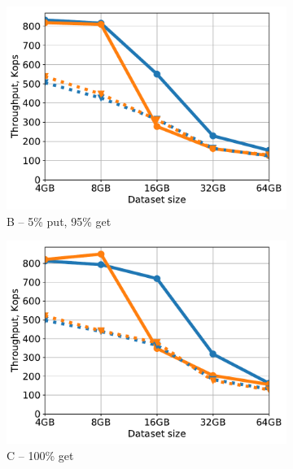 \begin{figure}[tb]
\begin{subfigure}{0.33\linewidth}
\includegraphics[width=\textwidth]{figs/Workload_B_line.pdf}
\caption{B -- 5\% put, 95\% get}
\label{fig:throughput:b}
\end{subfigure}
\hspace{70pt}
\begin{subfigure}{0.33\linewidth}
\includegraphics[width=\textwidth]{figs/Workload_C_line.pdf}
\caption{C -- 100\% get}
\label{fig:throughput:c}
\end{subfigure}
\begin{subfigure}{0.33\linewidth}

\end{subfigure}
\end{figure}
